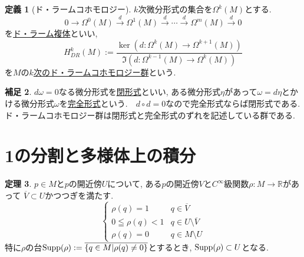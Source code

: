 \documentclass[dvipdfmx,a4paper,11pt]{article}
\newcommand{\R}{\mathbb{R}}
\newcommand{\Supp}{{\rm Supp}}
\theoremstyle{definition}
\newtheorem{thm}{定理}
\newtheorem{dfn}[thm]{定義}
\newtheorem{rem}[thm]{補足}
\begin{document}
  
    \begin{tcolorbox}[
    colback = white,
    colframe = green!35!black,
    fonttitle = \bfseries,
    breakable = true]
\begin{dfn}[ド・ラームコホモロジー]
$k$次微分形式の集合を$\Omega^{k}(M)$とする. 
$$
0 \rightarrow \Omega^{0}(M) \overset{d}{\rightarrow}\Omega^{1}(M) \overset{d}{\rightarrow} \cdots 
\overset{d}{\rightarrow} \Omega^{m}(M) \overset{d}{\rightarrow} 0
$$
を\underline{ド・ラーム複体}といい, 
$$
H_{DR}^{k}(M):= \frac{\ker (d : \Omega^{k}(M) \rightarrow  \Omega^{k+1}(M))}{\Im(d : \Omega^{k-1}(M) \rightarrow  \Omega^{k}(M)) }
$$
を$M$の\underline{$k$次のド・ラームコホモロジー群}という.


    \end{dfn}
    \end{tcolorbox}
    
\begin{rem}
$d\omega=0$なる微分形式を\underline{閉形式}といい, ある微分形式$\eta$があって$\omega = d \eta$とかける微分形式$\omega$を\underline{完全形式}という.　$d \circ d =0$なので完全形式ならば閉形式である.  ド・ラームコホモロジー群は閉形式と完全形式のずれを記述している群である.
\end{rem}

    
 \section{1の分割と多様体上の積分}
 
  \begin{tcolorbox}[
    colback = white,
    colframe = green!35!black,
    fonttitle = \bfseries,
    breakable = true]
\begin{thm}
$p \in M$と$p$の開近傍$U$について, ある$p$の開近傍$V$と$C^{\infty}$級関数$\rho : M \rightarrow \R$があって
$\overline{V} \subset U$かつつぎを満たす.
$$
\left\{
\begin{array}{ll}
\rho(q) =1& q \in \overline{V} \\
0 \leqq \rho(q) <1& q \in U \setminus \overline{V}\\
\rho(q)=0&q \in M \setminus U
\end{array}
\right.
$$
特に$\rho$の台${\rm Supp}(\rho) :=\overline{\{q \in M | \rho(q) \neq 0 \}}$とするとき, $\Supp(\rho) \subset U$となる.
     \end{thm}
    \end{tcolorbox} 
    
\end{document}
